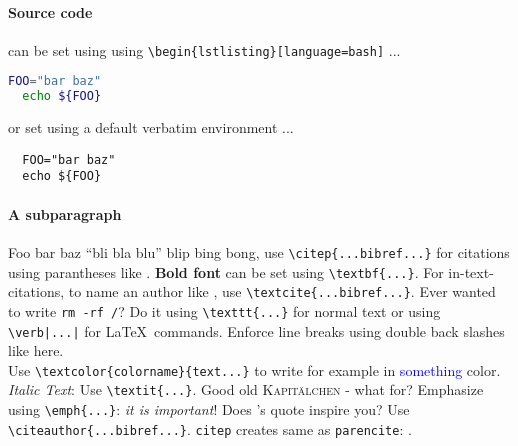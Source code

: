 
\paragraph{Source code} can be set using using \verb|\begin{lstlisting}[language=bash]| ...
  \begin{lstlisting}[language=bash]
  FOO="bar baz"
  echo ${FOO}
  \end{lstlisting}

  or set using a default verbatim environment ...
  \begin{verbatim}
  FOO="bar baz"
  echo ${FOO}
  \end{verbatim}

\paragraph{A subparagraph}
  Foo bar baz ``bli bla blu'' blip bing bong, use \verb|\citep{...bibref...}| for citations
  using parantheses like \citep{elearnSolutionIndividual}.
  \textbf{Bold font} can be set using \verb|\textbf{...}|.
  For in-text-citations, to name an author like \textcite{elearnSolutionIndividual},
  use \verb|\textcite{...bibref...}|. Ever wanted to
  write \texttt{rm -rf /}? Do it using \verb|\texttt{...}| for normal text
  or using \verb!\verb|...|! for \LaTeX\ commands. Enforce line breaks
  using double back slashes like here.
  \\
  Use \verb|\textcolor{colorname}{text...}|
  to write for example in \textcolor{blue}{something} color.
  \\
  \textit{Italic Text}: Use \verb|\textit{...}|.
  Good old \textsc{Kapitälchen} - what for? Emphasize using \verb|\emph{...}|: \emph{it is important}!
  Does \citeauthor{elearnSolutionIndividual}'s quote inspire you? Use \verb|\citeauthor{...bibref...}|.
  \texttt{citep} creates same as \texttt{parencite}: \citep{elearnSolutionIndividual}.

